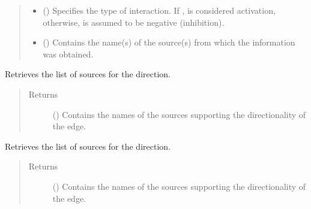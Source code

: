 \documentclass[letterpaper,10pt,english]{sphinxmanual}
\begin{document}
\begin{fulllineitems}
\begin{fulllineitems}
\begin{quote}
\begin{description}
\begin{itemize}
\item {} 
 () \textendash{} Specifies the type of interaction. If , is
considered activation, otherwise, is assumed to be negative
(inhibition).

\item {} 
 () \textendash{} Contains the name(s) of the source(s) from which the
information was obtained.

\end{itemize}

\end{description}\end{quote}

\end{fulllineitems}


\begin{fulllineitems}
\label{\detokenize{main:pypath.main.Direction.sources_reverse}}
Retrieves the list of sources for the  direction.
\begin{quote}\begin{description}
\item[{Returns}] \leavevmode
() \textendash{} Contains the names of the sources supporting the
 directionality of the edge.

\end{description}\end{quote}

\end{fulllineitems}


\begin{fulllineitems}
\label{\detokenize{main:pypath.main.Direction.sources_straight}}
Retrieves the list of sources for the 
direction.
\begin{quote}\begin{description}
\item[{Returns}] \leavevmode
() \textendash{} Contains the names of the sources supporting the
 directionality of the edge.


\end{description}
\end{quote}
\end{fulllineitems}
\end{fulllineitems}
\end{document}
